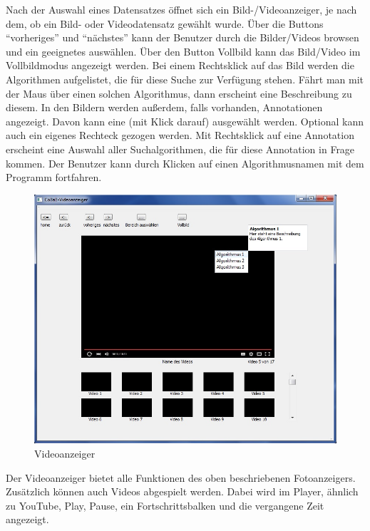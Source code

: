 Nach der Auswahl eines Datensatzes öffnet sich ein Bild-/Videoanzeiger, je nach dem, ob ein Bild- oder Videodatensatz gewählt wurde. Über die Buttons \enquote{vorheriges} und \enquote{nächstes} kann der Benutzer durch die Bilder/Videos browsen und ein geeignetes auswählen. Über den Button Vollbild kann das Bild/Video im Vollbildmodus angezeigt werden.
Bei einem Rechtsklick auf das Bild werden die Algorithmen aufgelistet, die für diese Suche zur Verfügung stehen. Fährt man mit der Maus über einen solchen Algorithmus, dann erscheint eine Beschreibung zu diesem.
In den Bildern werden außerdem, falls vorhanden, Annotationen angezeigt. Davon kann eine (mit Klick darauf) ausgewählt werden. Optional kann auch ein eigenes Rechteck gezogen werden. Mit Rechtsklick auf eine Annotation erscheint eine Auswahl aller Suchalgorithmen, die für diese Annotation in Frage kommen. Der Benutzer kann durch Klicken auf einen Algorithmusnamen mit dem Programm fortfahren.

\begin{figure}[H]
\includegraphics[width=1\linewidth]{img/Videoanzeiger}
\caption{Videoanzeiger}
\label{fig:videoanzeiger}
\end{figure}
Der Videoanzeiger bietet alle Funktionen des oben beschriebenen Fotoanzeigers. Zusätzlich können auch Videos abgespielt werden. Dabei wird im Player, ähnlich zu YouTube, Play, Pause, ein Fortschrittsbalken und die vergangene Zeit angezeigt. 

